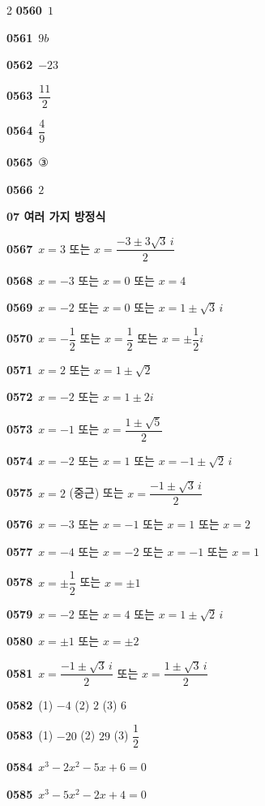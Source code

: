 \documentclass[10pt,a4paper]{article}
\begin{document}
\begin{multicols}{2}
\noindent\textbf{0560}\ $1$\par
\noindent\textbf{0561}\ $9b$\par
\noindent\textbf{0562}\ $-23$\par
\noindent\textbf{0563}\ $\dfrac{11}{2}$\par
\noindent\textbf{0564}\ $\dfrac{4}{9}$\par
\noindent\textbf{0565}\ ③\par
\noindent\textbf{0566}\ $2$\par
\noindent\textbf{07 여러 가지 방정식}\par\smallskip
\noindent\textbf{0567}\ $x=3$ 또는 $x=\dfrac{-3\pm 3\sqrt{3}\,i}{2}$\par
\noindent\textbf{0568}\ $x=-3$ 또는 $x=0$ 또는 $x=4$\par
\noindent\textbf{0569}\ $x=-2$ 또는 $x=0$ 또는 $x=1\pm\sqrt{3}\,i$\par
\noindent\textbf{0570}\ $x=-\dfrac{1}{2}$ 또는 $x=\dfrac{1}{2}$ 또는 $x=\pm\dfrac{1}{2}i$\par
\noindent\textbf{0571}\ $x=2$ 또는 $x=1\pm\sqrt{2}$\par
\noindent\textbf{0572}\ $x=-2$ 또는 $x=1\pm 2i$\par
\noindent\textbf{0573}\ $x=-1$ 또는 $x=\dfrac{1\pm\sqrt{5}}{2}$\par
\noindent\textbf{0574}\ $x=-2$ 또는 $x=1$ 또는 $x=-1\pm\sqrt{2}\,i$\par
\noindent\textbf{0575}\ $x=2$ (중근) 또는 $x=\dfrac{-1\pm\sqrt{3}\,i}{2}$\par
\noindent\textbf{0576}\ $x=-3$ 또는 $x=-1$ 또는 $x=1$ 또는 $x=2$\par
\noindent\textbf{0577}\ $x=-4$ 또는 $x=-2$ 또는 $x=-1$ 또는 $x=1$\par
\noindent\textbf{0578}\ $x=\pm\dfrac{1}{2}$ 또는 $x=\pm 1$\par
\noindent\textbf{0579}\ $x=-2$ 또는 $x=4$ 또는 $x=1\pm\sqrt{2}\,i$\par
\noindent\textbf{0580}\ $x=\pm 1$ 또는 $x=\pm 2$\par
\noindent\textbf{0581}\ $x=\dfrac{-1\pm\sqrt{3}\,i}{2}$ 또는 $x=\dfrac{1\pm\sqrt{3}\,i}{2}$\par
\noindent\textbf{0582}\ (1) $-4$ \quad (2) $2$ \quad (3) $6$\par
\noindent\textbf{0583}\ (1) $-20$ \quad (2) $29$ \quad (3) $\dfrac{1}{2}$\par
\noindent\textbf{0584}\ $x^3-2x^2-5x+6=0$\par
\noindent\textbf{0585}\ $x^3-5x^2-2x+4=0$\par

\end{multicols}
\end{document}
